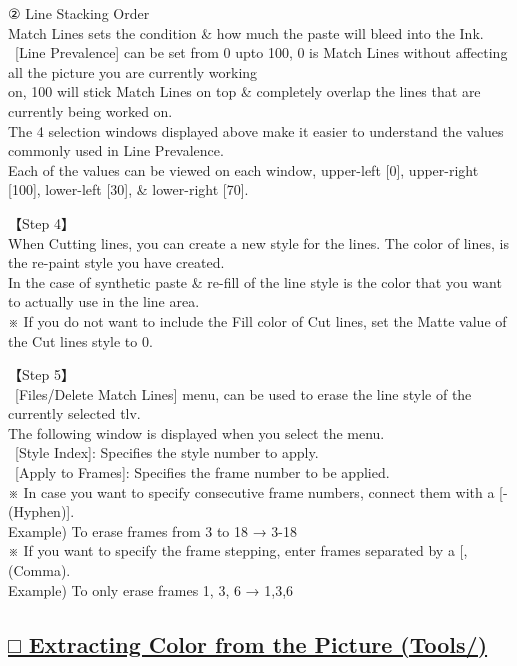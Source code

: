 \documentclass[a4paper,10pt]{article}
\begin{document}
\small
\noindent ② Line Stacking Order\\
\footnotesize
Match Lines sets the condition \& how much the paste will bleed into the Ink.\\
\ [Line Prevalence] can be set from 0 upto 100, 0 is Match Lines without affecting all the picture you are currently working\\
 on, 100 will stick Match Lines on top \& completely overlap the lines that are currently being worked on.\\
The 4 selection windows displayed above make it easier to understand the values commonly used in Line Prevalence.\\
Each of the values can be viewed on each window, upper-left [0], upper-right [100], lower-left [30], \& lower-right [70].\\[0.7em]
\par
\normalsize
\noindent 【Step 4】\\
\footnotesize
When Cutting lines, you can create a new style for the lines. The color of lines, is the re-paint style you have created.\\
In the case of synthetic paste \& re-fill of the line style is the color that you want to actually use in the line area.\\
※ If you do not want to include the Fill color of Cut lines, set the Matte value of the Cut lines style to 0.\\[0.7em]
\par
\normalsize
\noindent 【Step 5】\\
\small
\ [Files/Delete Match Lines] menu, can be used to erase the line style of the currently selected tlv.\\
\footnotesize
The following window is displayed when you select the menu.\\
\ [Style Index]: Specifies the style number to apply.\\
\ [Apply to Frames]: Specifies the frame number to be applied.\\
※ In case you want to specify consecutive frame numbers, connect them with a [- (Hyphen)].\\
Example) To erase frames from 3 to 18 → 3-18\\
※ If you want to specify the frame stepping, enter frames separated by a [, (Comma).\\
Example) To only erase frames 1, 3, 6 → 1,3,6

\newpage

\subsection*{\uline{□ Extracting Color from the Picture (Tools/)}}
\end{document}
